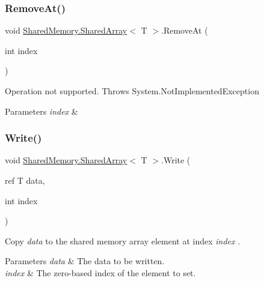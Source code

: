\subsubsection{\texorpdfstring{Remove\+At()}{RemoveAt()}}
{\footnotesize\ttfamily void \hyperlink{class_shared_memory_1_1_shared_array}{Shared\+Memory.\+Shared\+Array}$<$ T $>$.Remove\+At (\begin{DoxyParamCaption}\item[{int}]{index }\end{DoxyParamCaption})\hspace{0.3cm}{\ttfamily [inline]}}



Operation not supported. Throws System.\+Not\+Implemented\+Exception 


\begin{DoxyParams}{Parameters}
{\em index} & \\
\hline
\end{DoxyParams}
\mbox{\label{class_shared_memory_1_1_shared_array_af68d1184f8bb367b46dff81642abf6e5}} 
\subsubsection{\texorpdfstring{Write()}{Write()}\hspace{0.1cm}{\footnotesize\ttfamily [1/2]}}
{\footnotesize\ttfamily void \hyperlink{class_shared_memory_1_1_shared_array}{Shared\+Memory.\+Shared\+Array}$<$ T $>$.Write (\begin{DoxyParamCaption}\item[{ref T}]{data,  }\item[{int}]{index }\end{DoxyParamCaption})\hspace{0.3cm}{\ttfamily [inline]}}



Copy {\itshape data}  to the shared memory array element at index {\itshape index} . 


\begin{DoxyParams}{Parameters}
{\em data} & The data to be written.\\
\hline
{\em index} & The zero-\/based index of the element to set.\\
\hline
\end{DoxyParams}
\mbox{\label{class_shared_memory_1_1_shared_array_a0768d39e8f999328b650b64b219b16b5}} 
